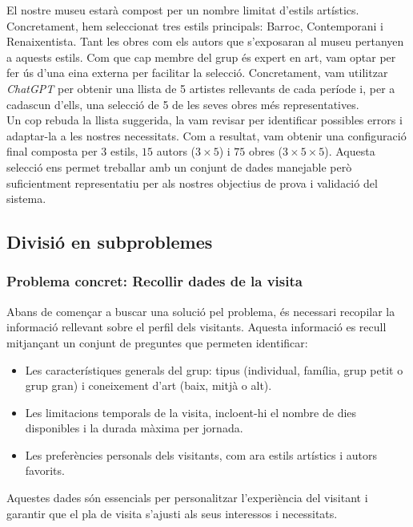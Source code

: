\documentclass[a4paper]{article}
\begin{document}
	El nostre museu estarà compost per un nombre limitat d'estils artístics. Concretament, hem seleccionat tres estils principals: Barroc, Contemporani i Renaixentista. Tant les obres com els autors que s'exposaran al museu pertanyen a aquests estils. Com que cap membre del grup és expert en art, vam optar per fer ús d'una eina externa per facilitar la selecció. Concretament, vam utilitzar \textit{ChatGPT} per obtenir una llista de 5 artistes rellevants de cada període i, per a cadascun d'ells, una selecció de 5 de les seves obres més representatives.\\
	
	Un cop rebuda la llista suggerida, la vam revisar per identificar possibles errors i adaptar-la a les nostres necessitats. Com a resultat, vam obtenir una configuració final composta per $3$ estils, $15$ autors ($3 \times 5$) i $75$ obres ($3 \times 5 \times 5$). Aquesta selecció ens permet treballar amb un conjunt de dades manejable però suficientment representatiu per als nostres objectius de prova i validació del sistema.
	
	\subsection{Divisió en subproblemes}
	\label{sec:Subproblemes}
	
	\subsubsection{Problema concret: Recollir dades de la visita}
	
	Abans de començar a buscar una solució pel problema, és necessari recopilar la informació rellevant sobre el perfil dels visitants. Aquesta informació es recull mitjançant un conjunt de preguntes que permeten identificar:
	\begin{itemize}
		\item Les característiques generals del grup: tipus (individual, família, grup petit o grup gran) i coneixement d’art (baix, mitjà o alt).
		\item Les limitacions temporals de la visita, incloent-hi el nombre de dies disponibles i la durada màxima per jornada.
		\item Les preferències personals dels visitants, com ara estils artístics i autors favorits.
	\end{itemize}
	
	Aquestes dades són essencials per personalitzar l’experiència del visitant i garantir que el pla de visita s’ajusti als seus interessos i necessitats.
	
\end{document}
